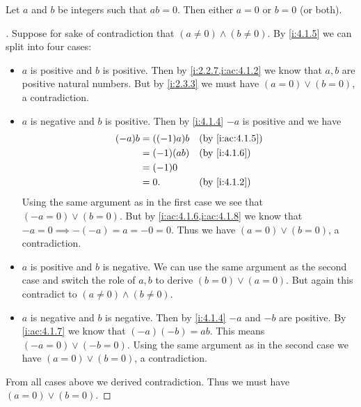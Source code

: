 \begin{prop}\label{i:4.1.8}
  Let \(a\) and \(b\) be integers such that \(ab = 0\).
  Then either \(a = 0\) or \(b = 0\) (or both).
\end{prop}

\begin{proof}[]
  Suppose for sake of contradiction that \((a \neq 0) \land (b \neq 0)\).
  By \cref{i:4.1.5} we can split into four cases:
  \begin{itemize}
    \item \(a\) is positive and \(b\) is positive.
          Then by \cref{i:2.2.7,i:ac:4.1.2} we know that \(a, b\) are positive natural numbers.
          But by \cref{i:2.3.3} we must have \((a = 0) \lor (b = 0)\), a contradiction.
    \item \(a\) is negative and \(b\) is positive.
          Then by \cref{i:4.1.4} \(-a\) is positive and we have
          \begin{align*}
            (-a) b & = ((-1) a) b &  & \by{i:ac:4.1.5} \\
                   & = (-1) (ab)  &  & \by{i:4.1.6}    \\
                   & = (-1) 0                          \\
                   & = 0.         &  & \by{i:4.1.2}
          \end{align*}
          Using the same argument as in the first case we see that \((-a = 0) \lor (b = 0)\).
          But by \cref{i:ac:4.1.6,i:ac:4.1.8} we know that \(-a = 0 \implies -(-a) = a = -0 = 0\).
          Thus we have \((a = 0) \lor (b = 0)\), a contradiction.
    \item \(a\) is positive and \(b\) is negative.
          We can use the same argument as the second case and switch the role of \(a, b\) to derive \((b = 0) \lor (a = 0)\).
          But again this contradict to \((a \neq 0) \land (b \neq 0)\).
    \item \(a\) is negative and \(b\) is negative.
          Then by \cref{i:4.1.4} \(-a\) and \(-b\) are positive.
          By \cref{i:ac:4.1.7} we know that \((-a)(-b) = ab\).
          This means \((-a = 0) \lor (-b = 0)\).
          Using the same argument as in the second case we have \((a = 0) \lor (b = 0)\), a contradiction.
  \end{itemize}
  From all cases above we derived contradiction.
  Thus we must have \((a = 0) \lor (b = 0)\).
\end{proof}


